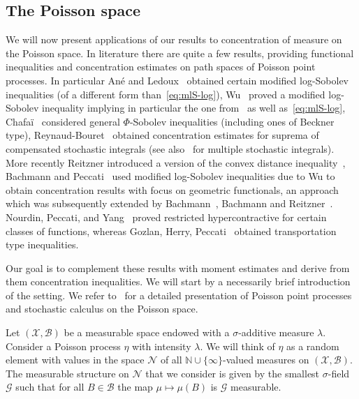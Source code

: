 \documentclass[a4paper]{amsart}
\theoremstyle{definition}
\theoremstyle{remark}
\numberwithin{equation}{section}
\newcommand*{\NN}{\mathbb{N}}
\begin{document}
\subsection{The Poisson space} \label{sec:Poisson}
We will now present applications of our results to concentration of measure on the Poisson space. In literature there are quite a few results, providing functional inequalities and concentration estimates on path spaces of Poisson point processes. In particular An\'e and Ledoux~\cite{MR1757600} obtained certain modified log-Sobolev inequalities (of a different form than~\eqref{eq:mlS-log}), Wu~\cite{MR1800540} proved a modified log-Sobolev inequality implying in particular the one from~\cite{MR1757600} as well as~\eqref{eq:mlS-log}, Chafa\"i~\cite{MR2081075} considered general $\Phi$-Sobolev inequalities (including ones of Beckner type), Reynaud-Bouret~\cite{MR1981635} obtained concentration estimates for suprema of compensated stochastic  integrals (see also~\cite{MR2073426,MR2294982} for multiple stochastic integrals). More recently Reitzner introduced a version of the convex distance inequality~\cite{MR3151752}, Bachmann and Peccati~\cite{MR3485348} used modified log-Sobolev inequalities due to Wu to obtain concentration results with focus on geometric functionals, an approach which was subsequently extended by Bachmann~\cite{MR3473096}, Bachmann and Reitzner~\cite{MR3849811}. Nourdin, Peccati, and Yang~\cite{nourdin2019restricted} proved restricted hypercontractive for certain classes of functions, whereas Gozlan, Herry, Peccati~\cite{gozlan2020transport} obtained transportation type inequalities.

Our goal is to complement these results with moment estimates and derive from them concentration inequalities. We will start by a necessarily brief introduction of the setting. We refer to~\cite{MR3791470,MR3585396} for a detailed presentation of Poisson point processes and stochastic calculus on the Poisson space.


Let $(\mathcal{X},\mathcal{B})$ be a measurable space endowed with a $\sigma$-additive measure $\lambda$. Consider a Poisson process $\eta$ with intensity $\lambda$. We will think of $\eta$  as a random element with values in the space $\mathcal{N}$ of all $\NN\cup\{\infty\}$-valued measures on $(\mathcal{X},\mathcal{B})$. The measurable structure on $\mathcal{N}$ that we consider is given by the smallest $\sigma$-field $\mathcal{G}$ such that for all $B\in \mathcal{B}$ the map $\mu \mapsto \mu(B)$ is $\mathcal{G}$ measurable.
\end{document}
